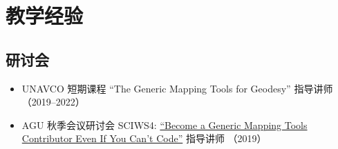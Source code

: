 \section{教学经验}

\subsection{研讨会}
\begin{itemize}
\item UNAVCO 短期课程 ``The Generic Mapping Tools for Geodesy'' 指导讲师（2019--2022）
\item AGU 秋季会议研讨会 SCIWS4: \href{https://www.agu.org/Events/SCIWS4-Generic-Mapping-Tools}{``Become a Generic Mapping Tools Contributor Even If You Can't Code''} 指导讲师 （2019）
\end{itemize}

